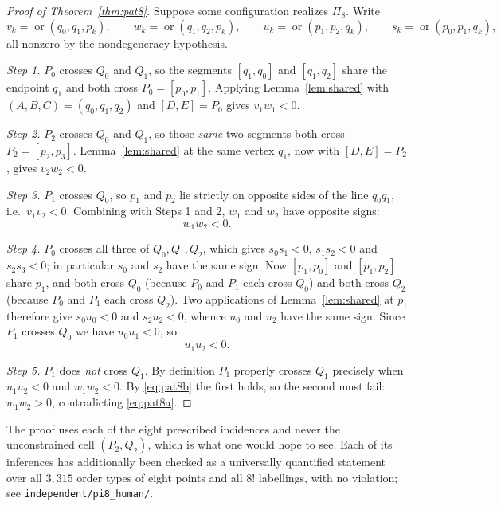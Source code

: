 \documentclass[11pt,a4paper]{article}
\theoremstyle{plain}
\theoremstyle{definition}
\theoremstyle{remark}
\newcommand{\orient}{\operatorname{or}}
\begin{document}
\begin{proof}[Proof of Theorem~\ref{thm:pat8}]
Suppose some configuration realizes $\Pi_8$. Write
\[
  v_k=\orient(q_0,q_1,p_k),\qquad
  w_k=\orient(q_1,q_2,p_k),\qquad
  u_k=\orient(p_1,p_2,q_k),\qquad
  s_k=\orient(p_0,p_1,q_k),
\]
all nonzero by the nondegeneracy hypothesis.

\emph{Step 1.} $P_0$ crosses $Q_0$ and $Q_1$, so the segments $[q_1,q_0]$ and
$[q_1,q_2]$ share the endpoint $q_1$ and both cross $P_0=[p_0,p_1]$. Applying
Lemma~\ref{lem:shared} with $(A,B,C)=(q_0,q_1,q_2)$ and $[D,E]=P_0$ gives
$v_1w_1<0$.

\emph{Step 2.} $P_2$ crosses $Q_0$ and $Q_1$, so those \emph{same} two segments
both cross $P_2=[p_2,p_3]$. Lemma~\ref{lem:shared} at the same vertex $q_1$,
now with $[D,E]=P_2$, gives $v_2w_2<0$.

\emph{Step 3.} $P_1$ crosses $Q_0$, so $p_1$ and $p_2$ lie strictly on opposite
sides of the line $q_0q_1$, i.e.\ $v_1v_2<0$. Combining with Steps 1 and 2,
$w_1$ and $w_2$ have opposite signs:
\begin{equation}\label{eq:pat8a}
  w_1w_2<0 .
\end{equation}

\emph{Step 4.} $P_0$ crosses all three of $Q_0,Q_1,Q_2$, which gives
$s_0s_1<0$, $s_1s_2<0$ and $s_2s_3<0$; in particular $s_0$ and $s_2$ have the
same sign. Now $[p_1,p_0]$ and $[p_1,p_2]$ share $p_1$, and both cross $Q_0$
(because $P_0$ and $P_1$ each cross $Q_0$) and both cross $Q_2$ (because $P_0$
and $P_1$ each cross $Q_2$). Two applications of Lemma~\ref{lem:shared} at
$p_1$ therefore give $s_0u_0<0$ and $s_2u_2<0$, whence $u_0$ and $u_2$ have the
same sign. Since $P_1$ crosses $Q_0$ we have $u_0u_1<0$, so
\begin{equation}\label{eq:pat8b}
  u_1u_2<0 .
\end{equation}

\emph{Step 5.} $P_1$ does \emph{not} cross $Q_1$. By definition $P_1$ properly
crosses $Q_1$ precisely when $u_1u_2<0$ and $w_1w_2<0$. By \eqref{eq:pat8b} the
first holds, so the second must fail: $w_1w_2>0$, contradicting
\eqref{eq:pat8a}.
\end{proof}

The proof uses each of the eight prescribed incidences and never the
unconstrained cell $(P_2,Q_2)$, which is what one would hope to see. Each of
its inferences has additionally been checked as a universally quantified
statement over all $3{,}315$ order types of eight points and all $8!$
labellings, with no violation; see \texttt{independent/pi8\_human/}.
\end{document}
